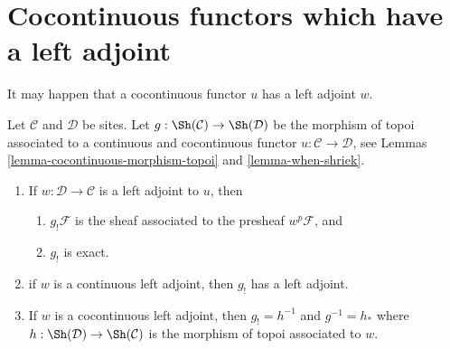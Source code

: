 \section{Cocontinuous functors which have a left adjoint}
\label{section-cocontinuous-left-adjoint}

\noindent
It may happen that a cocontinuous functor $u$ has a left adjoint $w$.

\begin{lemma}
\label{lemma-have-left-adjoint}
Let $\mathcal{C}$ and $\mathcal{D}$ be sites. Let
$g : \Sh(\mathcal{C}) \to \Sh(\mathcal{D})$ be
the morphism of topoi associated to a continuous and cocontinuous functor
$u : \mathcal{C} \to \mathcal{D}$, see
Lemmas \ref{lemma-cocontinuous-morphism-topoi} and
\ref{lemma-when-shriek}.
\begin{enumerate}
\item If $w : \mathcal{D} \to \mathcal{C}$ is a left adjoint to $u$, then
\begin{enumerate}
\item $g_!\mathcal{F}$ is the sheaf associated to the presheaf
$w^p\mathcal{F}$, and
\item $g_!$ is exact.
\end{enumerate}
\item if $w$ is a continuous left adjoint, then $g_!$
has a left adjoint.
\item If $w$ is a cocontinuous left adjoint, then $g_! = h^{-1}$ and
$g^{-1} = h_*$ where $h : \Sh(\mathcal{D}) \to \Sh(\mathcal{C})$ is
the morphism of topoi associated to $w$.
\end{enumerate}
\end{lemma}

